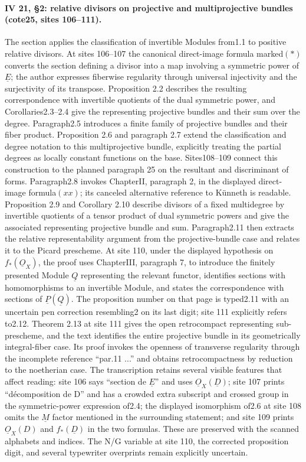 \paragraph{IV 21, \S2: relative divisors on projective and multiprojective bundles (cote25, sites 106--111).}
The section applies the classification of invertible Modules from1.1 to positive relative divisors. At sites 106--107 the canonical direct-image formula marked$(*)$ converts the section defining a divisor into a map involving a symmetric power of $\underline E$; the author expresses fiberwise regularity through universal injectivity and the surjectivity of its transpose. Proposition 2.2 describes the resulting correspondence with invertible quotients of the dual symmetric power, and Corollaries2.3--2.4 give the representing projective bundles and their sum over the degree. Paragraph2.5 introduces a finite family of projective bundles and their fiber product. Proposition 2.6 and paragraph 2.7 extend the classification and degree notation to this multiprojective bundle, explicitly treating the partial degrees as locally constant functions on the base. Sites108--109 connect this construction to the planned paragraph 25 on the resultant and discriminant of forms. Paragraph2.8 invokes ChapterII, paragraph 2, in the displayed direct-image formula$(xx)$; its canceled alternative reference to Künneth is readable. Proposition 2.9 and Corollary 2.10 describe divisors of a fixed multidegree by invertible quotients of a tensor product of dual symmetric powers and give the associated representing projective bundle and sum. Paragraph2.11 then extracts the relative representability argument from the projective-bundle case and relates it to the Picard prescheme. At site 110, under the displayed hypothesis on $f_*(\underline O_X)$, the proof uses ChapterIII, paragraph 7, to introduce the finitely presented Module $\underline Q$ representing the relevant functor, identifies sections with homomorphisms to an invertible Module, and states the correspondence with sections of $\underline P(\underline Q)$. The proposition number on that page is typed2.11 with an uncertain pen correction resembling2 on its last digit; site 111 explicitly refers to2.12. Theorem 2.13 at site 111 gives the open retrocompact representing sub-prescheme, and the text identifies the entire projective bundle in its geometrically integral-fiber case. Its proof invokes the openness of transverse regularity through the incomplete reference ``par.11 ...'' and obtains retrocompactness by reduction to the noetherian case. The transcription retains several visible features that affect reading: site 106 says ``section de $\underline E$'' and uses $\underline O_X(\underline D)$; site 107 prints ``décomposition de D'' and has a crowded extra subscript and crossed group in the symmetric-power expression of2.4; the displayed isomorphism of2.6 at site 108 omits the $\underline M$ factor mentioned in the surrounding statement; and site 109 prints $\underline O_X(D)$ and $f_*(\underline D)$ in the two formulas. These are preserved with the scanned alphabets and indices. The N/G variable at site 110, the corrected proposition digit, and several typewriter overprints remain explicitly uncertain.
